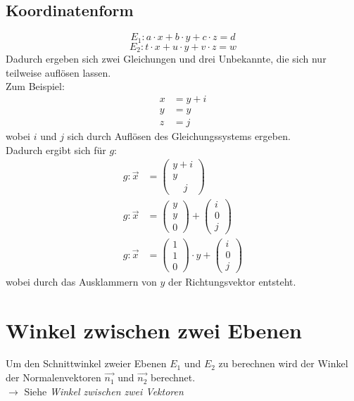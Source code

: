 \documentclass[a4paper,12pt]{article}
\begin{document}
\subsection{Koordinatenform}
$$E_1 : a \cdot x + b \cdot y + c \cdot z = d$$
$$E_2 : t \cdot x + u \cdot y + v \cdot z = w$$
Dadurch ergeben sich zwei Gleichungen und drei Unbekannte, die sich nur teilweise auflösen lassen.\\
Zum Beispiel:
\begin{equation}
\begin{split}
x & = y + i\\
y & = y\\
z & = j
\end{split}
\end{equation}
wobei $i$ und $j$ sich durch Auflösen des Gleichungssystems ergeben.\\
Dadurch ergibt sich für $g$:
\begin{equation}
\begin{split}
g : \vec{x} & = \begin{pmatrix}y + i\\y\ \ \ \ \ \\\ \ \ \ \ j\end{pmatrix}\\
g : \vec{x} & = \begin{pmatrix}y\\y\\0\end{pmatrix} + \begin{pmatrix}i\\0\\j\end{pmatrix}\\
g : \vec{x} & = \begin{pmatrix}1\\1\\0\end{pmatrix} \cdot y + \begin{pmatrix}i\\0\\j\end{pmatrix}
\end{split}
\end{equation}
wobei durch das Ausklammern von $y$ der Richtungsvektor entsteht.
\pagebreak
\section{Winkel zwischen zwei Ebenen}
Um den Schnittwinkel zweier Ebenen $E_1$ und $E_2$ zu berechnen wird der Winkel der Normalenvektoren $\vec{n_1}$ und $\vec{n_2}$ berechnet.\\
$\rightarrow$ Siehe \textit{Winkel zwischen zwei Vektoren}
\end{document}
